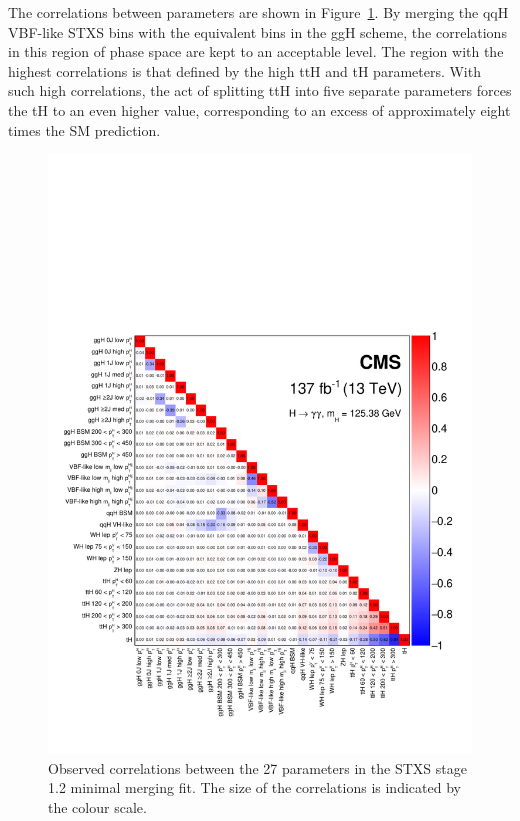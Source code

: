 The correlations between parameters are shown in Figure~\ref{fig:stage1p2_minimal_correlations}. By merging the qqH VBF-like STXS bins with the equivalent bins in the ggH scheme, the correlations in this region of phase space are kept to an acceptable level. The region with the highest correlations is that defined by the high \ptH ttH and tH parameters. With such high correlations, the act of splitting ttH into five separate parameters forces the tH \xsbr to an even higher value, corresponding to an excess of approximately eight times the SM prediction. 


\begin{figure}[htb!]
  \centering
  \includegraphics[width=.93\textwidth]{Figures/hgg_results/stage1p2_minimal_correlations.pdf}
  \caption[Correlations in the STXS stage 1.2 minimal merging parameters]
  {
    Observed correlations between the 27 parameters in the STXS stage 1.2 minimal merging fit. The size of the correlations is indicated by the colour scale.
  }
  \label{fig:stage1p2_minimal_correlations}
\end{figure}

